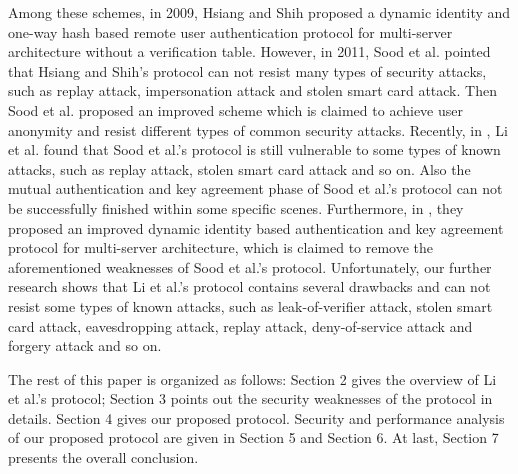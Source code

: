 \documentclass[preprint,12pt]{elsarticle}
\begin{document}
Among these schemes, in 2009, Hsiang and Shih proposed a dynamic identity and one-way hash based remote user authentication protocol for multi-server architecture without a verification table\cite{passwd-based-multi1}. However, in 2011, Sood et al.\cite{passwd-based-multi2} pointed that Hsiang and Shih's protocol can not resist many types of security attacks, such as replay attack, impersonation attack and stolen smart card attack. Then Sood et al. proposed an improved scheme which is claimed to achieve user anonymity and resist different types of common security attacks. Recently, in \cite{passwd-based-multi7}, Li et al. found that Sood et al.'s protocol is still vulnerable to some types of known attacks, such as replay attack, stolen smart card attack and so on. Also the mutual authentication and key agreement phase of Sood et al.'s protocol can not be successfully finished within some specific scenes. Furthermore, in \cite{passwd-based-multi7}, they proposed an improved dynamic identity based authentication and key agreement protocol for multi-server architecture, which is claimed to remove the aforementioned weaknesses of Sood et al.'s protocol. Unfortunately, our further research shows that Li et al.'s protocol contains several drawbacks and can not resist some types of known attacks, such as leak-of-verifier attack, stolen smart card attack, eavesdropping attack, replay attack, deny-of-service attack and forgery attack and so on.


The rest of this paper is organized as follows: Section 2 gives the overview of Li et al.'s protocol; Section 3 points out the security weaknesses of the protocol in details. Section 4 gives our proposed protocol. Security and performance analysis of our proposed protocol are given in Section 5 and Section 6. At last, Section 7 presents the overall conclusion. 	

\begin{table}[!ht]
\caption{Notations used in Li et. al.'s paper}
\centering
\end{table}
\end{document}
